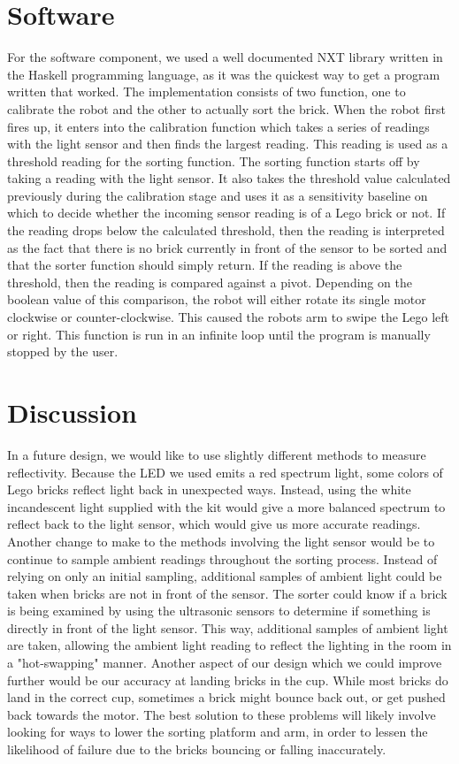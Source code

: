 \documentclass{article}
\begin{document}
\section{Software}
For the software component, we used a well documented NXT library written in the Haskell programming language, as it was the quickest way to get a program written that worked.
The implementation consists of two function, one to calibrate the robot and the other to actually sort the brick.
When the robot first fires up, it enters into the calibration function which takes a series of readings with the light sensor and then finds the largest reading.
This reading is used as a threshold reading for the sorting function.
The sorting function starts off by taking a reading with the light sensor.
It also takes the threshold value calculated previously during the calibration stage and uses it as a sensitivity baseline on which to decide whether the incoming sensor reading is of a Lego brick or not.
If the reading drops below the calculated threshold, then the reading is interpreted as the fact that there is no brick currently in front of the sensor to be sorted and that the sorter function should simply return.
If the reading is above the threshold, then the reading is compared against a pivot.
Depending on the boolean value of this comparison, the robot will either rotate its single motor clockwise or counter-clockwise.
This caused the robots arm to swipe the Lego left or right.
This function is run in an infinite loop until the program is manually stopped by the user.

\section{Discussion}
In a future design, we would like to use slightly different methods to measure reflectivity.
Because the LED we used emits a red spectrum light, some colors of Lego bricks reflect light back in unexpected ways.
Instead, using the white incandescent light supplied with the kit would give a more balanced spectrum to reflect back to the light sensor, which would give us more accurate readings.
Another change to make to the methods involving the light sensor would be to continue to sample ambient readings throughout the sorting process.
Instead of relying on only an initial sampling, additional samples of ambient light could be taken when bricks are not in front of the sensor.
The sorter could know if a brick is being examined by using the ultrasonic sensors to determine if something is directly in front of the light sensor.
This way, additional samples of ambient light are taken, allowing the ambient light reading to reflect the lighting in the room in a "hot-swapping" manner.
Another aspect of our design which we could improve further would be our accuracy at landing bricks in the cup.
While most bricks do land in the correct cup, sometimes a brick might bounce back out, or get pushed back towards the motor.
The best solution to these problems will likely involve looking for ways to lower the sorting platform and arm, in order to lessen the likelihood of failure due to the bricks bouncing or falling inaccurately.  
\end{document}
